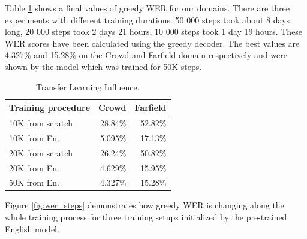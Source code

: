 \documentclass[a4paper]{article}
\begin{document}
Table \ref{tab:wer_50k} shows a final values of greedy WER for our domains. There are three experiments with different training durations. 50 000 steps took about 8 days long, 20 000 steps took 2 days 21 hours, 10 000 steps took 1 day 19 hours. These WER scores have been calculated using the greedy decoder. The best values are 4.327\% and 15.28\% on the Crowd and Farfield domain respectively and were shown by the model which was trained for 50K steps. 

\begin{table}[t]
  \caption{Transfer Learning Influence.}
  \label{tab:wer_50k}
  \centering
  \begin{tabular}{lrr}
    \toprule
    \textbf{Training procedure } & \textbf{Crowd} & \textbf{Farfield} \\
    \midrule
    10K from scratch   &  28.84\%   & 52.82\% \\
    10K from En.    & 5.095\%       & 17.13\%  \\
    \midrule
    20K from scratch   &  26.24\%   & 50.82\% \\
    20K from En.    & 4.629\%       & 15.95\% \\
    \midrule
    50K from En.    & 4.327\%       & 15.28\% \\
    \bottomrule
  \end{tabular}
\end{table}


Figure \ref{fig:wer_steps} demonstrates how greedy WER is changing along the whole training process for three training setups initialized by the pre-trained English model. 
\end{document}
